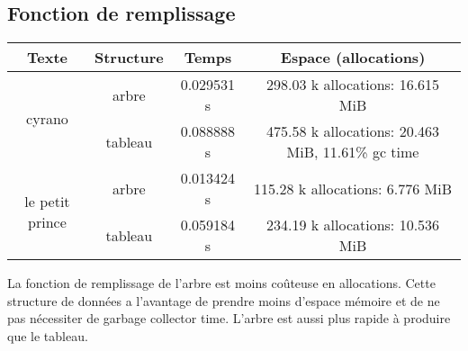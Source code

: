 \documentclass[a4paper,12pt]{article}
\begin{document}
\subsection{Fonction de remplissage}
\begin{center}
  \begin{tabular}{|c|c|c|c|}
    \hline
    Texte & Structure & Temps & Espace (allocations)\\
    \hline
    \multirow{2}{*}{cyrano} & arbre & 0.029531 s & 298.03 k allocations: 16.615 MiB\\
    \cline{2-4}
    & tableau & 0.088888 s & 475.58 k allocations: 20.463 MiB, 11.61\% gc time\\
    \hline
    \multirow{2}{*}{le petit prince} & arbre & 0.013424 s & 115.28 k allocations: 6.776 MiB\\
    \cline{2-4}
    & tableau & 0.059184 s & 234.19 k allocations: 10.536 MiB\\
    \hline
  \end{tabular}
\end{center}

La fonction de remplissage de l'arbre est moins coûteuse en allocations. Cette structure de données a l'avantage de prendre moins d'espace mémoire et de ne pas nécessiter de garbage collector time. L'arbre est aussi plus rapide à produire que le tableau.
\end{document}
